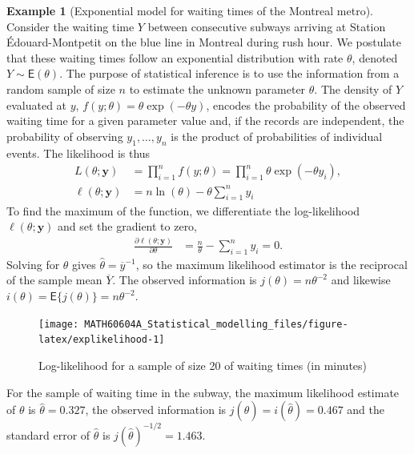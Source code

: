\documentclass[
  11pt,
  letterpaper,
]{book}
\theoremstyle{definition}
\theoremstyle{definition}
\newtheorem{example}{Example}[chapter]
\theoremstyle{definition}
\theoremstyle{remark}
\begin{document}
\begin{example}[Exponential model for waiting times of the Montreal metro]
\protect\hypertarget{exm:waitingtime}{}{\label{exm:waitingtime} {} }Consider the waiting time \(Y\) between consecutive subways arriving at Station Édouard-Montpetit on the blue line in Montreal during rush hour. We postulate that these waiting times follow an exponential distribution with rate \(\theta\), denoted \(Y \sim \mathsf{E}(\theta)\). The purpose of statistical inference is to use the information from a random sample of size \(n\) to estimate the unknown parameter \(\theta\). The density of \(Y\) evaluated at \(y\), \(f(y; \theta)=\theta\exp(-\theta y)\), encodes the probability of the observed waiting time for a given parameter value and, if the records are independent, the probability of observing \(y_1, \ldots, y_n\) is the product of probabilities of individual events. The likelihood is thus
\begin{align*}
L(\theta; \boldsymbol{y}) &= \prod_{i=1}^n f(y; \theta)= \prod_{i=1}^n\theta\exp(-\theta y_i),\\
\ell(\theta; \boldsymbol{y}) & = n\ln(\theta) - \theta\sum_{i=1}^n y_i
\end{align*}
To find the maximum of the function, we differentiate the log-likelihood \(\ell(\theta; \boldsymbol{y})\) and set the gradient to zero,
\begin{align*}
\frac{\partial \ell(\theta; \boldsymbol{y})}{\partial \theta} & = \frac{n}{\theta} - \sum_{i=1}^n y_i =0.
\end{align*}
Solving for \(\theta\) gives \(\widehat{\theta} = \overline{y}^{-1}\), so the maximum likelihood estimator is the reciprocal of the sample mean \(\overline{Y}\). The observed information is \(j(\theta) = n\theta^{-2}\) and likewise \(i(\theta)=\mathsf{E}\{j(\theta)\}=n\theta^{-2}\).
\end{example}

\begin{figure}

{\centering \texttt{[image: MATH60604A\_Statistical\_modelling\_files/figure-latex/explikelihood-1]} 

}

\caption{Log-likelihood for a sample of size 20 of waiting times (in minutes)}\label{fig:explikelihood}
\end{figure}

For the sample of waiting time in the subway, the maximum likelihood estimate of \(\theta\) is \(\widehat{\theta}=0.327\), the observed information is \(j(\widehat{\theta})=i(\widehat{\theta})=0.467\) and the standard error of \(\widehat{\theta}\) is \(j(\widehat{\theta})^{-1/2}=1.463\).
\end{document}
